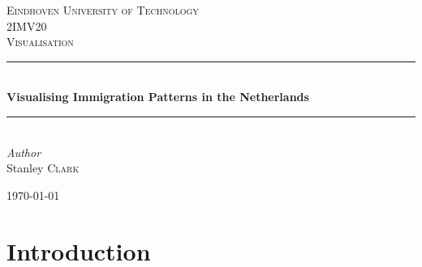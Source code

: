\documentclass[11pt,a4paper,titlepage]{article}
\begin{document}
\begin{titlepage} %
	\newcommand{\HRule}{\rule{\linewidth}{0.5mm}} %
	
	
	\textsc{\LARGE Eindhoven University of Technology}\\[1.5cm] %
	
	\textsc{\Large 2IMV20}\\[0.5cm] %
	
	\textsc{\large Visualisation}\\[0.5cm] %
	
	
	\HRule\\[0.4cm]
	
	{\huge\bfseries Visualising Immigration Patterns in the Netherlands}\\[0.4cm] %
	
	\HRule\\[1.5cm]
	
	
	{\large\textit{Author}}\\
	Stanley \textsc{Clark} %
	
	
	\vfill\vfill\vfill %
	
	{\large\today} %
	
	
	\vfill %
	
\end{titlepage}

\tableofcontents
\clearpage

\setcounter{page}{1}

\section{Introduction}

\lipsum[1-5]
\end{document}
